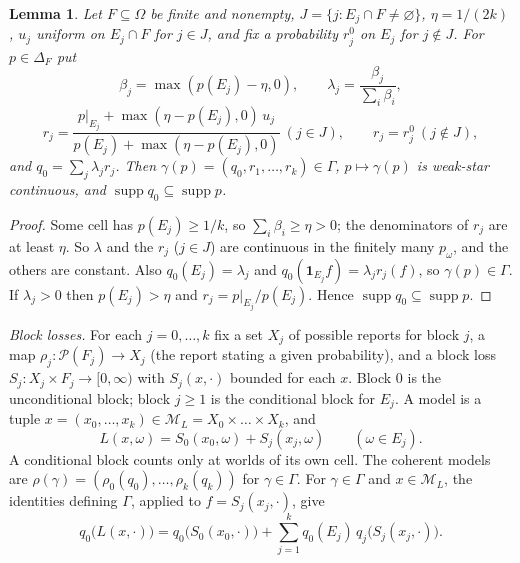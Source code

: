 \documentclass[11pt]{article}
\newtheorem{lemma}[theorem]{Lemma}
\theoremstyle{definition}
\theoremstyle{remark}
\newcommand{\M}{\mathcal M}
\newcommand{\PP}{\mathcal P}
\newcommand{\one}{\mathbf 1}
\newcommand{\supp}{\operatorname{supp}}
\begin{document}
\begin{lemma}\label{lem:section}
Let $F\subseteq\Omega$ be finite and nonempty, $J=\{j:E_j\cap F\ne\varnothing\}$, $\eta=1/(2k)$, $u_j$ uniform on $E_j\cap F$ for $j\in J$, and fix a probability $r_j^0$ on $E_j$ for $j\notin J$. For $p\in\Delta_F$ put
\[
\beta_j=\max(p(E_j)-\eta,0),\qquad \lambda_j=\frac{\beta_j}{\sum_i\beta_i},
\]
\[
r_j=\frac{p|_{E_j}+\max(\eta-p(E_j),0)\,u_j}{p(E_j)+\max(\eta-p(E_j),0)}\ (j\in J),\qquad r_j=r_j^0\ (j\notin J),
\]
and $q_0=\sum_j\lambda_jr_j$. Then $\gamma(p)=(q_0,r_1,\dots,r_k)\in\Gamma$, $p\mapsto\gamma(p)$ is weak-star continuous, and $\supp q_0\subseteq\supp p$.
\end{lemma}
\begin{proof}
Some cell has $p(E_j)\ge1/k$, so $\sum_i\beta_i\ge\eta>0$; the denominators of $r_j$ are at least $\eta$. So $\lambda$ and the $r_j$ ($j\in J$) are continuous in the finitely many $p_\omega$, and the others are constant. Also $q_0(E_j)=\lambda_j$ and $q_0(\one_{E_j}f)=\lambda_jr_j(f)$, so $\gamma(p)\in\Gamma$. If $\lambda_j>0$ then $p(E_j)>\eta$ and $r_j=p|_{E_j}/p(E_j)$. Hence $\supp q_0\subseteq\supp p$.
\end{proof}

\emph{Block losses.} For each $j=0,\dots,k$ fix a set $X_j$ of possible reports for block $j$, a map $\rho_j:\PP(F_j)\to X_j$ (the report stating a given probability), and a block loss $S_j:X_j\times F_j\to[0,\infty)$ with $S_j(x,\cdot)$ bounded for each $x$. Block $0$ is the unconditional block; block $j\ge1$ is the conditional block for $E_j$. A model is a tuple $x=(x_0,\dots,x_k)\in\M_L=X_0\times\dots\times X_k$, and
\[
 L(x,\omega)=S_0(x_0,\omega)+S_j(x_j,\omega)\qquad(\omega\in E_j).
\]
A conditional block counts only at worlds of its own cell. The coherent models are $\rho(\gamma)=(\rho_0(q_0),\dots,\rho_k(q_k))$ for $\gamma\in\Gamma$. For $\gamma\in\Gamma$ and $x\in\M_L$, the identities defining $\Gamma$, applied to $f=S_j(x_j,\cdot)$, give
\begin{equation}\label{eq:blocks}
 q_0\bigl(L(x,\cdot)\bigr)=q_0\bigl(S_0(x_0,\cdot)\bigr)+\sum_{j=1}^kq_0(E_j)\,q_j\bigl(S_j(x_j,\cdot)\bigr).
\end{equation}
\end{document}
